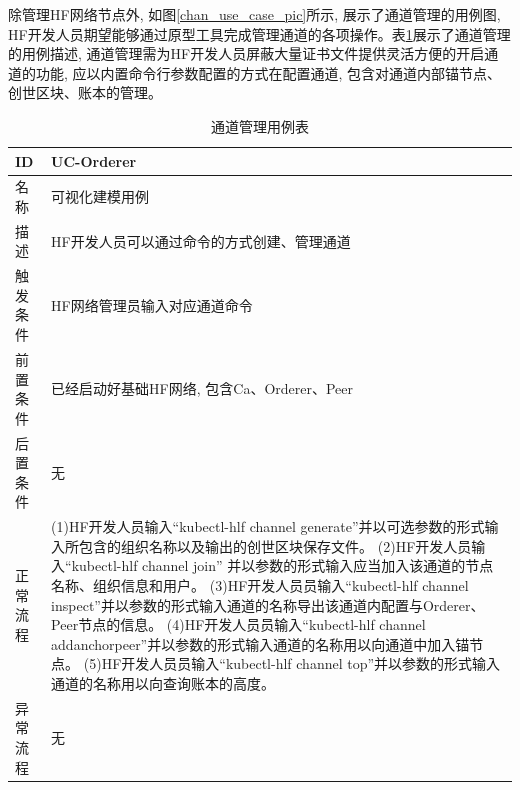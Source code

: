除管理HF网络节点外, 如图\ref{chan_use_case_pic}所示, 展示了通道管理的用例图, HF开发人员期望能够通过原型工具完成管理通道的各项操作。表\ref{chan_use_case}展示了通道管理的用例描述, 通道管理需为HF开发人员屏蔽大量证书文件提供灵活方便的开启通道的功能, 应以内置命令行参数配置的方式在配置通道, 包含对通道内部锚节点、创世区块、账本的管理。

{\footnotesize
\begin{longtable}[h]{m{60pt}|m{280pt}}
    \caption[通道管理用例表]{通道管理用例表} \label{chan_use_case} \\
        \hline  
        ID&UC-Orderer\\
        \hline
        名称&可视化建模用例\\
        \hline
        描述&HF开发人员可以通过命令的方式创建、管理通道\\
        \hline
        触发条件&HF网络管理员输入对应通道命令\\
        \hline
        前置条件&已经启动好基础HF网络, 包含Ca、Orderer、Peer\\
        \hline
        后置条件&无\\
        \hline
        正常流程& (1)HF开发人员输入“kubectl-hlf channel generate”并以可选参数的形式输入所包含的组织名称以及输出的创世区块保存文件。
        \newline (2)HF开发人员输入“kubectl-hlf channel join” 并以参数的形式输入应当加入该通道的节点名称、组织信息和用户。
        \newline (3)HF开发人员员输入“kubectl-hlf channel inspect”并以参数的形式输入通道的名称导出该通道内配置与Orderer、Peer节点的信息。
        \newline (4)HF开发人员员输入“kubectl-hlf channel addanchorpeer”并以参数的形式输入通道的名称用以向通道中加入锚节点。
        \newline (5)HF开发人员员输入“kubectl-hlf channel top”并以参数的形式输入通道的名称用以向查询账本的高度。\\
        \hline 
        异常流程& 无 \\
        \hline
    \end{longtable} 
}


